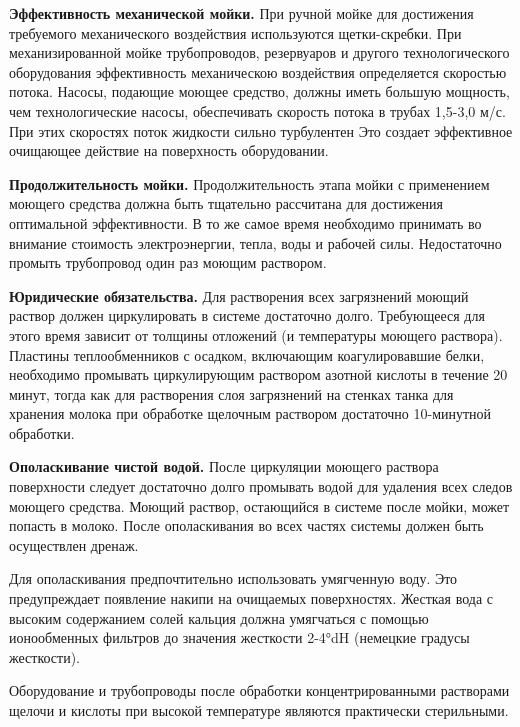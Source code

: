 {\par \redline \textbf{Эффективность механической мойки.} При ручной мойке для достижения требуемого механического воздействия используются щетки-скребки. При механизированной мойке трубопроводов, резервуаров и другого технологического оборудования эффективность механическою воздействия определяется скоростью потока. Насосы, подающие моющее средство, должны иметь большую мощность, чем технологические насосы, обеспечивать скорость потока в трубах 1,5-3,0 м/с. При этих скоростях поток жидкости сильно турбулентен Это создает эффективное очищающее действие на поверхность оборудовании.

\par \redline \textbf{Продолжительность мойки.} Продолжительность этапа мойки с применением моющего средства должна быть тщательно рассчитана для достижения оптимальной эффективности. В то же самое время необходимо принимать во внимание стоимость электроэнергии, тепла, воды и рабочей силы. Недостаточно промыть трубопровод один раз моющим раствором.

\par \redline \textbf{Юридические обязательства.} Для растворения всех загрязнений моющий раствор должен циркулировать в системе достаточно долго. Требующееся для этого время зависит от толщины отложений (и температуры моющего раствора). Пластины теплообменников с осадком, включающим коагулировавшие белки, необходимо промывать циркулирующим раствором азотной кислоты в течение 20 минут, тогда как для растворения слоя загрязнений на стенках танка для хранения молока при обработке щелочным раствором достаточно 10-минутной обработки.

\par \redline \textbf{Ополаскивание чистой водой.} После циркуляции моющего раствора поверхности следует достаточно долго промывать водой для удаления всех следов моющего средства. Моющий раствор, остающийся в системе после мойки, может попасть в молоко. После ополаскивания во всех частях системы должен быть осуществлен дренаж.

\par \redline Для ополаскивания предпочтительно использовать умягченную воду. Это предупреждает появление накипи на очищаемых поверхностях. Жесткая вода с высоким содержанием солей кальция должна умягчаться с помощью ионообменных фильтров до значения жесткости 2-4°dH (немецкие градусы жесткости). 

\par \redline Оборудование и трубопроводы после обработки концентрированными растворами щелочи и кислоты при высокой температуре являются практически стерильными.

}
